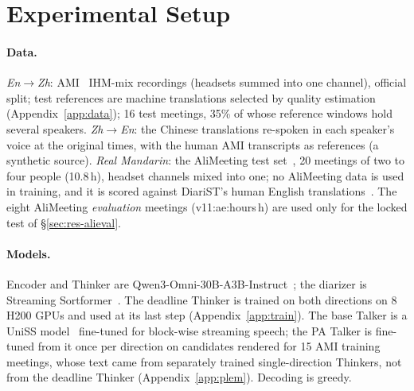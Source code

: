 \section{Experimental Setup}
\label{sec:setup}



\paragraph{Data.} \emph{En$\rightarrow$Zh}: AMI~\citep{carletta2005ami} IHM-mix recordings (headsets summed into one
channel), official split; test references are machine translations selected by quality estimation
(Appendix~\ref{app:data}); 16 test
meetings, 35\% of whose reference windows hold several speakers. \emph{Zh$\rightarrow$En}: the Chinese translations
re-spoken in each speaker's voice at the original times, with the human AMI transcripts as references (a synthetic
source). \emph{Real Mandarin}: the AliMeeting test
set~\citep{yu2022m2met}, 20 meetings of two to four people (10.8\,h), headset channels mixed into one; no AliMeeting
data is used in training, and it is scored against DiariST's human English translations~\citep{yang2024diarist}.\ifAliEval{} The eight AliMeeting
\emph{evaluation} meetings (\num{v11:ae:hours}\,h) are used only for the locked test of \S\ref{sec:res-alieval}.\fi

\paragraph{Models.} Encoder and Thinker are Qwen3-Omni-30B-A3B-Instruct~\citep{xu2025qwen3omni}; the diarizer is
Streaming Sortformer~\citep{medennikov2025streaming}. The deadline Thinker is trained on both directions on 8 H200 GPUs
and used at its last step (Appendix~\ref{app:train}). The base Talker is a UniSS model~\citep{uniss2025} fine-tuned for
block-wise streaming speech; the PA Talker is fine-tuned from it once per direction on candidates rendered for 15 AMI
training meetings, whose text came from separately trained single-direction Thinkers, not from the deadline Thinker
(Appendix~\ref{app:plem}). Decoding is greedy.

